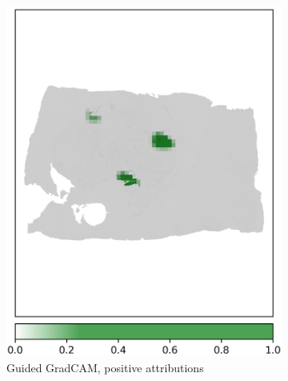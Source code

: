 \begin{figure}[h!t]
\begin{subfigure}[b]{0.49\textwidth}
         \includegraphics[width=\textwidth]{latex/captum/case129/guided_gradcam_pos_case129-stain19-dead_414days.png}
         \caption{Guided GradCAM, positive attributions}
     \end{subfigure}
    \hfill
     \begin{subfigure}[b]{0.49\textwidth}
         \centering

\end{subfigure}
\end{figure}
